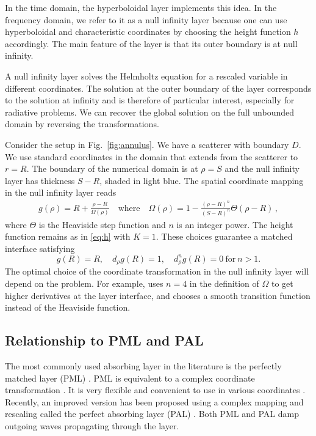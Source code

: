 \documentclass[final,onefignum,onetabnum]{siamart190516}
\begin{document}
In the time domain, the hyperboloidal layer \cite{ZENGINOGLU20112286} implements this idea. In the frequency domain, we refer to it as a null infinity layer because one can use hyperboloidal and characteristic coordinates by choosing the height function $h$ accordingly. The main feature of the layer is that its outer boundary is at null infinity. 

A null infinity layer solves the Helmholtz equation for a rescaled variable in different coordinates. The solution at the outer boundary of the layer corresponds to the solution at infinity and is therefore of particular interest, especially for radiative problems. We can recover the global solution on the full unbounded domain by reversing the transformations. 

Consider the setup in Fig.~\ref{fig:annulus}. We have a scatterer with boundary $D$. We use standard coordinates in the domain that extends from the scatterer to $r=R$. The boundary of the numerical domain is at $\rho=S$ and the null infinity layer has thickness $S-R$, shaded in light blue. The spatial coordinate mapping in the null infinity layer reads
\begin{align}\label{eq:layer}
g(\rho)=R+ \frac{\rho-R}{\Omega(\rho)} \quad \mathrm{where} \quad \Omega(\rho) = 1 - \frac{(\rho-R)^n}{(S-R)^n}\Theta(\rho-R)\,,
\end{align}
where $\Theta$ is the Heaviside step function and $n$ is an integer power. The height function remains as in \eqref{eq:h} with $K=1$. These choices guarantee a matched interface satisfying
\[ g(R) = R, \quad d_\rho g(R) = 1, \quad d_\rho^n g(R) = 0 \ \mathrm{for} \ n>1. \] 
The optimal choice of the coordinate transformation in the null infinity layer will depend on the problem. For example, \cite{bernuzzi2011binary} uses $n=4$ in the definition of $\Omega$ to get higher derivatives at the layer interface, and \cite{hilditch2018evolution} chooses a smooth transition function instead of the Heaviside function.

\subsection{Relationship to PML and PAL}
The most commonly used absorbing layer in the literature is the perfectly matched layer (PML) \cite{BERENGER1994185}. PML is equivalent to a complex coordinate transformation \cite{chew19943d}. It is very flexible and convenient to use in various coordinates \cite{collino1998perfectly}. Recently, an improved version has been proposed using a complex mapping and rescaling called the perfect absorbing layer (PAL) \cite{wang2017perfect, yang2021truly}. Both PML and PAL damp outgoing waves propagating through the layer.
\end{document}
